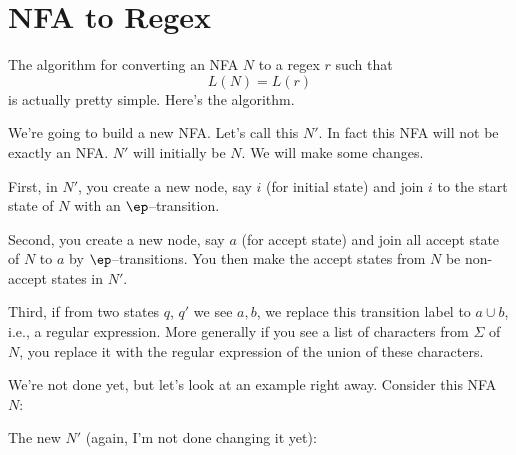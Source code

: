 \section{NFA to Regex}

The algorithm for converting an NFA $N$ to a regex $r$ such that
\[
L(N) = L(r)
\]
is actually pretty simple.
Here's the algorithm.

We're going to build a new NFA. 
Let's call this $N'$.
In fact this NFA will not be exactly an NFA.
$N'$ will initially be $N$.
We will make some changes.

First, in $N'$, 
you create a new node, say $i$ (for initial state) and join $i$ to 
the start state of $N$ with an $\ep$--transition.

Second, 
you create a new node, say $a$ (for accept state) and join 
all accept state of $N$ to $a$ by $\ep$--transitions.
You then make the accept states from $N$ be non-accept states in $N'$.

Third,
if from two states $q$, $q'$ we see $a,b$, we
replace this transition label to $a \cup b$, i.e., a regular expression.
More generally if you see a list of characters from $\Sigma$ of $N$,
you replace it with the regular expression of the union of these characters.

We're not done yet, but let's look at an example right away.
Consider this NFA $N$:
\begin{center}
\end{center}
The new $N'$ (again, I'm not done changing it yet):
\begin{center}
\end{center}


